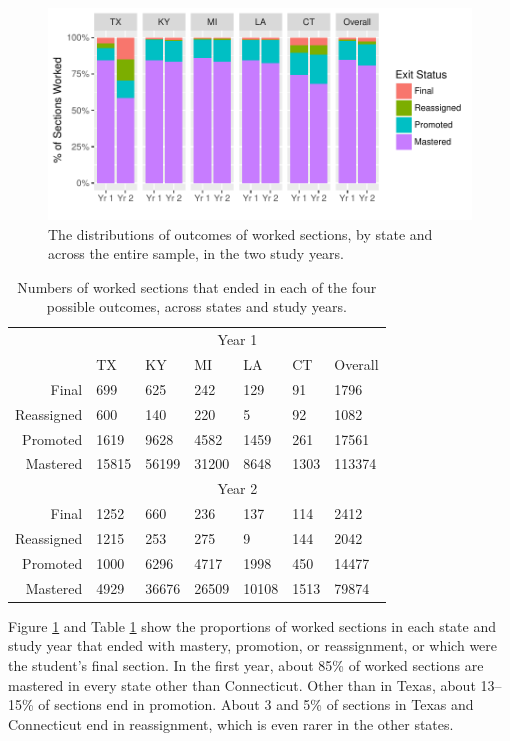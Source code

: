 \documentclass[12pt]{article}\usepackage[]{graphicx}\usepackage[]{color}
\makeatletter
\def\maxwidth{ %
  \ifdim\Gin@nat@width>\linewidth
    \linewidth
  \else
    \Gin@nat@width
  \fi
}
\makeatother
\begin{document}
\begin{figure}
  \centering

\includegraphics[width=\maxwidth]{figure/overallStatus-1} 

\caption{The distributions of outcomes of worked sections, by state and across the
  entire sample, in the two study years.}
\label{fig:overallStatus}
\end{figure}

\begin{table}
  \centering
 \begin{tabular}{rllllll}%

&   \multicolumn{6}{c}{Year 1}\\%
&TX&KY&MI&LA&CT&Overall\\Final&699&625&242&129&91&1796\\Reassigned&600&140&220&5&92&1082\\Promoted&1619&9628&4582&1459&261&17561\\Mastered&15815&56199&31200&8648&1303&113374\\&\multicolumn{6}{c}{Year 2}\\ 
Final&1252&660&236&137&114&2412\\Reassigned&1215&253&275&9&144&2042\\Promoted&1000&6296&4717&1998&450&14477\\Mastered&4929&36676&26509&10108&1513&79874\\

\end{tabular}
\caption{Numbers of worked sections that ended in each of the
  four possible outcomes, across states and study years.}
\label{tab:overallStatus}
\end{table}

Figure \ref{fig:overallStatus} and Table \ref{tab:overallStatus} show
the proportions of worked sections in each state and study year that
ended with mastery, promotion, or reassignment, or which were the
student's final section.
In the first year, about
85\% of
worked sections are mastered in every
state other than Connecticut.
Other than in Texas, about
13--15\%
of sections end in promotion.
About 3
and 5\% of sections in Texas
and Connecticut end in reassignment, which is even rarer in the other states.
\end{document}
